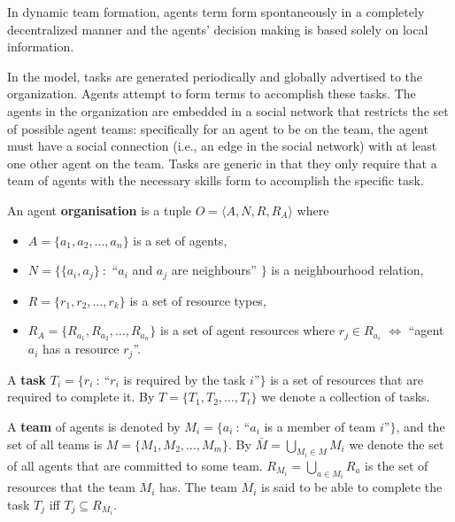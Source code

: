 \documentclass{llncs}
\begin{document}
\cite{gaston2005agent}
In dynamic team formation, agents term form spontaneously in a completely decentralized manner and the agents' decision making is based solely on local information.

In the model, tasks are generated periodically and globally advertised to the organization. Agents attempt to form terms to accomplish these tasks. The agents in the organization are embedded in a social network that restricts the set of possible agent teams: specifically for an agent to be on the team, the agent must have a social connection (i.e., an edge in the social network) with at least one other agent on the team. Tasks are generic in that they only require that a team of agents with the necessary skills form to accomplish the specific task.

\begin{definition}
An agent \textbf{organisation} is a tuple $O=\langle A, N, R, R_A  \rangle$ where
\noindent
\begin{itemize}
\item $A= \{ a_1,a_2,...,a_n \} $ is a set of agents,
\item $N=\{\{a_i,a_j \}\ :$ ``$a_i$ and $a_j$ are neighbours'' $\}$ is a neighbourhood relation,
\item $R=\{r_1,r_2,\dots,r_k\}$ is a set of resource types,
\item $R_A=\{R_{a_1}, R_{a_2}, \dots, R_{a_n}\}$ is a set of agent resources where $r_j \in R_{a_i} $ $\iff$ ``agent $a_i$ has a resource $r_j$''.
\end{itemize}
\end{definition}

\begin{definition}
A \textbf{task} $T_i=\{r_i\ :\ $``$r_i$ is required by the task $i$''$\}$ is a set of resources that are required to complete it. By $T=\{T_1, T_2,\dots, T_t\}$ we denote a collection of tasks.
\end{definition}

\begin{definition}
A \textbf{team} of agents is denoted by $M_i=\{a_i\ :\ $``$a_i$ is a member of team $i$''$\}$, and the set of all teams is $M=\{M_1, M_2,\dots , M_m\}$. By $\bar{M} = \bigcup_{M_i \in M} M_i$ we denote the set of all agents that are committed to some team. $R_{M_i}=\bigcup_{a \in M_i}R_{a}$ is the set of resources that the team $M_i$ has. The team $M_i$ is said to be able to complete the task $T_j$ iff $T_j \subseteq R_{M_i}$.
\end{definition}
\end{document}
